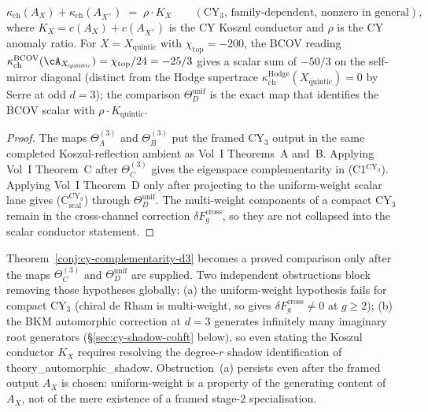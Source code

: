 \begin{theorem}[CY complementarity at \texorpdfstring{$d = 3$}{d = 3} through the comparison criterion]
\begin{enumerate}[label=\textup{(C$_{\mathrm{scal}}^{\mathrm{CY}_3}$)}]
 \[
 \kappa_{\mathrm{ch}}(A_X) + \kappa_{\mathrm{ch}}(A_{X^\vee}) \;=\; \rho \cdot K_X \qquad (\text{CY$_3$, family-dependent, nonzero in general}),
 \]
 where $K_X = c(A_X) + c(A_{X^\vee})$ is the CY Koszul conductor and $\rho$ is the CY anomaly ratio. For $X = X_{\mathrm{quintic}}$ with $\chi_{\mathrm{top}} = -200$, the BCOV reading $\kappa_{\mathrm{ch}}^{\mathrm{BCOV}}(\cA_{X_{\mathrm{quintic}}}) = \chi_{\mathrm{top}}/24 = -25/3$ gives a scalar sum of $-50/3$ on the self-mirror diagonal (distinct from the Hodge supertrace $\kappa_{\mathrm{ch}}^{\mathrm{Hodge}}(X_{\mathrm{quintic}}) = 0$ by Serre at odd $d = 3$); the comparison $\Theta_D^{\mathrm{unif}}$ is the exact map that identifies the BCOV scalar with $\rho \cdot K_{\mathrm{quintic}}$.
\end{enumerate}
\end{theorem}

\begin{proof}
The maps $\Theta_A^{(3)}$ and $\Theta_B^{(3)}$ put the framed CY$_3$
output in the same completed Koszul-reflection ambient as Vol~I
Theorems~A and~B. Applying Vol~I Theorem~C after
$\Theta_C^{(3)}$ gives the eigenspace complementarity in
(C1$^{\mathrm{CY}_3}$). Applying Vol~I Theorem~D only after projecting
to the uniform-weight scalar lane gives (C$_{\mathrm{scal}}^{\mathrm{CY}_3}$) through
$\Theta_D^{\mathrm{unif}}$. The multi-weight components of a compact
CY$_3$ remain in the cross-channel correction
$\delta F_g^{\mathrm{cross}}$, so they are not collapsed into the scalar
conductor statement.
\end{proof}

\begin{remark}[The remaining \texorpdfstring{$d = 3$}{d = 3} comparison maps]
\label{rem:d3-conjecture-rationale}
Theorem~\ref{conj:cy-complementarity-d3} becomes a proved comparison
only after the maps \(\Theta_C^{(3)}\) and
\(\Theta_D^{\mathrm{unif}}\) are supplied. Two independent
obstructions block removing those hypotheses globally: (a) the
uniform-weight hypothesis fails for compact CY$_3$ (chiral de Rham is
multi-weight, so gives
$\delta F_g^{\mathrm{cross}} \neq 0$ at $g \geq 2$); (b) the BKM
automorphic correction at $d = 3$ generates infinitely many imaginary root
generators (\S\ref{sec:cy-shadow-cohft} below), so even stating the Koszul
conductor $K_X$ requires resolving the degree-$r$ shadow identification of
theory\_automorphic\_shadow. Obstruction~(a) persists even after the framed
output $A_X$ is chosen: uniform-weight is a property of the generating
content of $A_X$, not of the mere existence of a framed stage-$2$
specialisation.
\end{remark}

